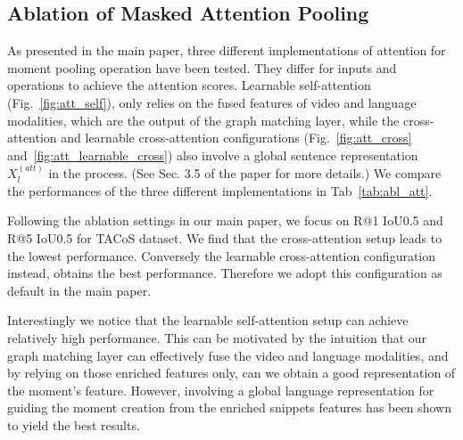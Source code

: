 \documentclass[10pt,twocolumn,letterpaper]{article}
\begin{document}
\subsection*{Ablation of Masked Attention Pooling}
As presented in the main paper, three different implementations of attention for moment pooling operation have been tested. They differ for inputs and operations to achieve the attention scores. Learnable self-attention (Fig.~\ref{fig:att_self}), only relies on the fused features of video and language modalities, which are the output of the graph matching layer, while the cross-attention and learnable cross-attention configurations (Fig.~\ref{fig:att_cross} and~\ref{fig:att_learnable_cross}) also involve a global sentence representation $X_l^{(att)}$ in the process. (See Sec. 3.5 of the paper for more details.) 
We compare the performances of the three different implementations in Tab~\ref{tab:abl_att}.


Following the ablation settings in our main paper, we focus on R@1 IoU0.5 and R@5 IoU0.5 for TACoS dataset.
We find that the cross-attention setup leads to the lowest performance. Conversely the learnable cross-attention configuration instead, obtains the best performance. Therefore we adopt this configuration as default in the main paper. 


Interestingly we notice that the learnable self-attention setup can achieve relatively high performance. This can be motivated by the intuition that our graph matching layer can effectively fuse the video and language modalities, and by relying on those enriched features only, can we obtain a good representation of the moment's feature. However, involving a global language representation for guiding the moment creation from the enriched snippets features has been shown to yield the best results. 

\begin{table}[!t]
    \centering \setlength{\tabcolsep}{3pt}
\renewcommand{\arraystretch}{1.1} 
\vspace{.1cm}
\caption{\label{tab:abl_att}{\bf Ablation of masked attention pooling implementations.} The experimental results show that the cross-attention setup leads to sub-optimal performance. Instead, the learnable cross-attention configuration obtains the best performance.} \end{table}
\end{document}
